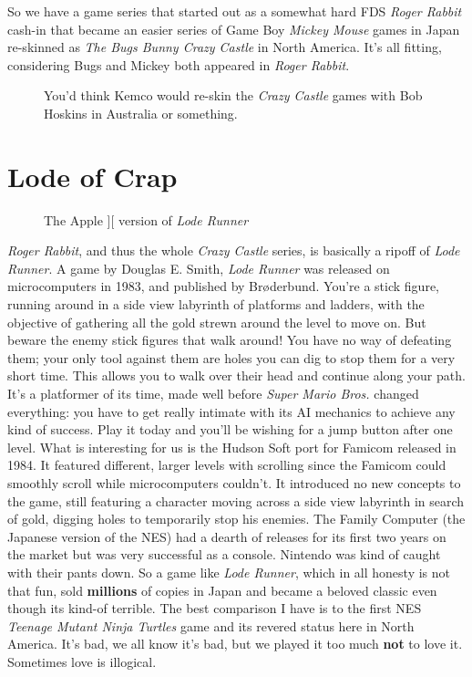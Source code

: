 \documentclass{book}
\begin{document}
So we have a game series that started out as a somewhat hard FDS \emph{Roger Rabbit} cash-in that became an easier series of Game Boy \emph{Mickey Mouse} games in Japan re-skinned as \emph{The Bugs Bunny Crazy Castle} in North America. It’s all fitting, considering Bugs and Mickey both appeared in \emph{Roger Rabbit}. ~\par
\FloatBarrier\vspace{\baselineskip}\begin{figure}[H]\caption*{You’d think Kemco would re-skin the \emph{Crazy Castle} games with Bob Hoskins in Australia or something.}\end{figure}
\FloatBarrier\section*{Lode of Crap}
\FloatBarrier\vspace{\baselineskip}\begin{figure}[H]\caption*{The Apple ][ version of \emph{Lode Runner}}\end{figure}
\emph{Roger Rabbit}, and thus the whole \emph{Crazy Castle} series, is basically a ripoff of \emph{Lode Runner}. A game by Douglas E. Smith, \emph{Lode Runner} was released on microcomputers in 1983, and published by Brøderbund. You’re a stick figure, running around in a side view labyrinth of platforms and ladders, with the objective of gathering all the gold strewn around the level to move on. But beware the enemy stick figures that walk around! You have no way of defeating them; your only tool against them are holes you can dig to stop them for a very short time. This allows you to walk over their head and continue along your path. It’s a platformer of its time, made well before \emph{Super Mario Bros.} changed everything: you have to get really intimate with its AI mechanics to achieve any kind of success. Play it today and you’ll be wishing for a jump button after one level. What is interesting for us is the Hudson Soft port for Famicom released in 1984. It featured different, larger levels with scrolling since the Famicom could smoothly scroll while microcomputers couldn’t. It introduced no new concepts to the game, still featuring a character moving across a side view labyrinth in search of gold, digging holes to temporarily stop his enemies. The Family Computer (the Japanese version of the NES) had a dearth of releases for its first two years on the market but was very successful as a console. Nintendo was kind of caught with their pants down. So a game like \emph{Lode Runner}, which in all honesty is not that fun, sold \textbf{millions} of copies in Japan and became a beloved classic even though its kind-of terrible. The best comparison I have is to the first NES \emph{Teenage Mutant Ninja Turtles} game and its revered status here in North America. It’s bad, we all know it’s bad, but we played it too much \textbf{not} to love it. Sometimes love is illogical.\par
\end{document}
